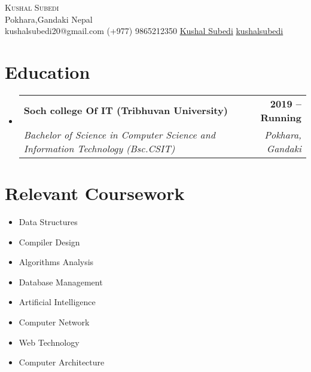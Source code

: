 \documentclass[letterpaper,11pt]{article}
\makeatletter
\newcommand{\resumeSubheading}[4]{
  \vspace{-2pt}\item
    \begin{tabular*}{1.0\textwidth}[t]{l@{\extracolsep{\fill}}r}
      \textbf{#1} & \textbf{\small #2} \\
      \textit{\small#3} & \textit{\small #4} \\
    \end{tabular*}\vspace{-7pt}
}
\newcommand{\resumeSubHeadingListStart}{\begin{itemize}[leftmargin=0.0in, label={}]}
\newcommand{\resumeSubHeadingListEnd}{\end{itemize}}
\makeatother
\begin{document}

\begin{center}
    {\Huge \scshape Kushal Subedi} \\ \vspace{1pt}
    Pokhara,Gandaki Nepal \\ \vspace{1pt}
     \faEnvelope\hspace{0.2cm} kushalsubedi20@gmail.com \hspace{0.3cm} \faPhone\hspace{0.2cm} (+977) 9865212350 \hspace{0.2cm}
    \faLinkedin\hspace{0.2cm} \href{https://www.linkedin.com/in/kushal-subedi-3a4a96223/}{Kushal Subedi} \hspace{0.2cm}\faGithub\hspace{0.2cm}\href{https://github.com/kushalsubedi}{kushalsubedi}
\end{center}


\section{Education}
  \resumeSubHeadingListStart
    \resumeSubheading
      {Soch college Of IT (Tribhuvan University)}{2019 -- Running}
      {Bachelor of Science in Computer Science and Information Technology (Bsc.CSIT)}{Pokhara, Gandaki}
  \resumeSubHeadingListEnd

\section{Relevant Coursework}
        \begin{multicols}{4}
            \begin{itemize}[itemsep=-5pt, parsep=3pt]
                \item\small Data Structures
                \item Compiler Design
                \item Algorithms Analysis
                \item Database Management
                \item Artificial Intelligence
                \item Computer Network
                \item Web Technology
                \item Computer Architecture
            \end{itemize}
        \end{multicols}
        \vspace*{2.0\multicolsep}
\end{document}
